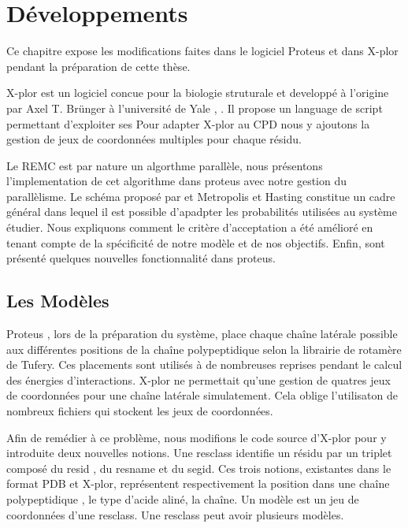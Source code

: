 \chapter{Développements}
\label{chap:developpements}

Ce chapitre expose les modifications faites dans le logiciel Proteus et dans X-plor pendant la préparation de cette thèse.

X-plor est un logiciel concue pour la biologie struturale et developpé à l'origine par Axel T. Brünger à l'université de Yale , \cite{Brünger92}. Il propose un language de script permettant d'exploiter ses Pour adapter X-plor au CPD nous y ajoutons la gestion de jeux de coordonnées multiples pour chaque résidu.

Le REMC est par nature un algorthme parallèle, nous présentons l'implementation de cet algorithme dans proteus avec notre gestion du parallèlisme. Le schéma proposé par et Metropolis et Hasting constitue un cadre général dans lequel il est possible d'apadpter les probabilités utilisées au système étudier. Nous expliquons comment le critère d'acceptation a été amélioré en tenant compte de la spécificité de notre modèle et de nos objectifs. Enfin, sont présenté quelques nouvelles fonctionnalité dans proteus.  


\section{Les Modèles }

Proteus , lors de la préparation du système, place chaque chaîne latérale possible aux différentes positions de la chaîne polypeptidique selon la librairie de rotamère de Tufery. Ces placements sont utilisés à de nombreuses reprises pendant le calcul des énergies d'interactions. X-plor ne permettait qu'une gestion de quatres jeux de coordonnées pour une chaîne latérale simulatement. Cela oblige l'utilisaton de nombreux fichiers qui stockent les jeux de coordonnées.

Afin de remédier à ce problème, nous modifions le code source d'X-plor pour y introduite deux nouvelles notions. Une resclass identifie un résidu par un triplet composé du resid , du resname et du segid. Ces trois notions, existantes dans le format PDB et X-plor, représentent respectivement la position dans une chaîne polypeptidique , le type d'acide aliné, la chaîne. Un modèle est un jeu de coordonnées d'une resclass. Une resclass peut avoir plusieurs modèles.


